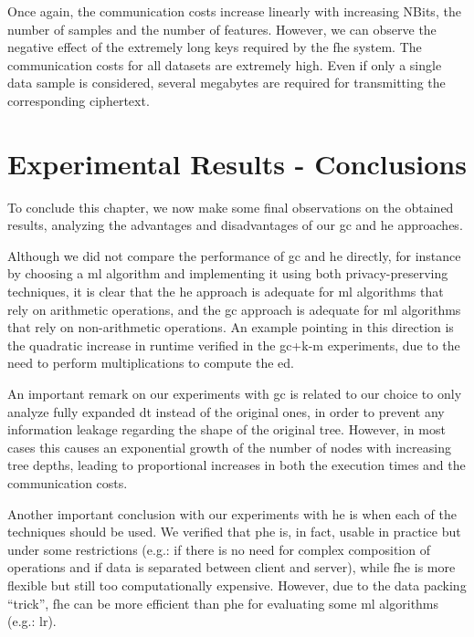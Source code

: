 Once again, the communication costs increase linearly with increasing NBits, the number of samples and the number of features. However, we can observe the negative effect of the extremely long keys required by the \ac{fhe} system. The communication costs for all datasets are extremely high. Even if only a single data sample is considered, several megabytes are required for transmitting the corresponding ciphertext.



\section{Experimental Results - Conclusions}
\label{sec:ExperimentalResultsConclusion}


To conclude this chapter, we now make some final observations on the obtained results, analyzing the advantages and disadvantages of our \ac{gc} and \ac{he} approaches.

Although we did not compare the performance of \ac{gc} and \ac{he} directly, for instance by choosing a \ac{ml} algorithm and implementing it using both privacy-preserving techniques, it is clear that the \ac{he} approach is adequate for \ac{ml} algorithms that rely on arithmetic operations, and the \ac{gc} approach is adequate for \ac{ml} algorithms that rely on non-arithmetic operations. An example pointing in this direction is the quadratic increase in runtime verified in the \ac{gc}+\ac{k-m} experiments, due to the need to perform multiplications to compute the \ac{ed}.

An important remark on our experiments with \ac{gc} is related to our choice to only analyze fully expanded \ac{dt} instead of the original ones, in order to prevent any information leakage regarding the shape of the original tree. However, in most cases this causes an exponential growth of the number of nodes with increasing tree depths, leading to proportional increases in both the execution times and the communication costs.
  

Another important conclusion with our experiments with \ac{he} is when each of the techniques should be used. We verified that \ac{phe} is, in fact, usable in practice but under some restrictions (e.g.: if there is no need for complex composition of operations and if data is separated between client and server), while \ac{fhe} is more flexible but still too computationally expensive. However, due to the data packing ``trick'', \ac{fhe} can be more efficient than \ac{phe} for evaluating some \ac{ml} algorithms (e.g.: \ac{lr}).



